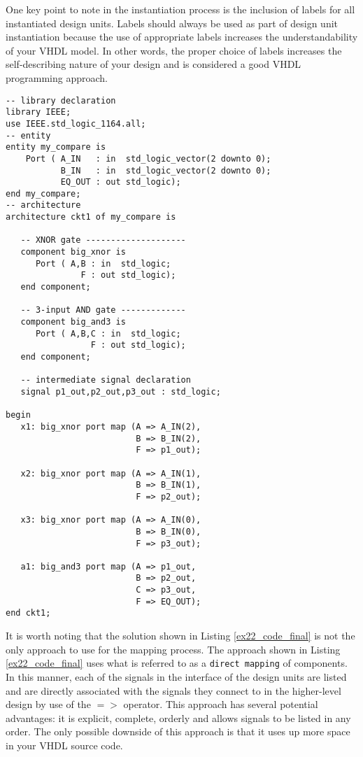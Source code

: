 One key point to note in the instantiation process is the inclusion of labels for all instantiated design units. Labels should always be used as part of design unit instantiation because the use of appropriate labels increases the understandability of your VHDL model. In other words, the proper choice of labels increases the self-describing nature of your design and is considered a good VHDL programming approach.

\noindent
\begin{minipage}{0.99\linewidth}
\begin{lstlisting}[label=ex22_code_final, caption=VHDL code for the design hierarchy for the 3-bit comparator.]
-- library declaration
library IEEE;
use IEEE.std_logic_1164.all;
-- entity
entity my_compare is
    Port ( A_IN   : in  std_logic_vector(2 downto 0);
           B_IN   : in  std_logic_vector(2 downto 0);
           EQ_OUT : out std_logic);
end my_compare;
-- architecture
architecture ckt1 of my_compare is

   -- XNOR gate --------------------
   component big_xnor is
      Port ( A,B : in  std_logic;
               F : out std_logic);
   end component;
 
   -- 3-input AND gate -------------
   component big_and3 is
      Port ( A,B,C : in  std_logic;
                 F : out std_logic);
   end component;

   -- intermediate signal declaration
   signal p1_out,p2_out,p3_out : std_logic; 

begin
   x1: big_xnor port map (A => A_IN(2),
                          B => B_IN(2),
                          F => p1_out); 

   x2: big_xnor port map (A => A_IN(1),
                          B => B_IN(1),
                          F => p2_out); 
  
   x3: big_xnor port map (A => A_IN(0),
                          B => B_IN(0),
                          F => p3_out); 
  
   a1: big_and3 port map (A => p1_out,
                          B => p2_out, 
                          C => p3_out,
                          F => EQ_OUT); 
end ckt1;
\end{lstlisting}
\end{minipage}

It is worth noting that the solution shown in Listing \ref{ex22_code_final} is not the only approach to use for the mapping process. The approach shown in Listing \ref{ex22_code_final} uses what is referred to as a \texttt{direct mapping} of components. In this manner, each of the signals in the interface of the design units are listed and are directly associated with the signals they connect to in the higher-level design by use of the $=>$ operator. This approach has several potential advantages: it is explicit, complete, orderly and allows signals to be listed in any order. The only possible downside of this approach is that it uses up more space in your VHDL source code. 

